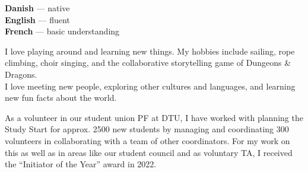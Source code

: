 \documentclass[9pt]{developercv} %
\begin{document}
\begin{minipage}[t]{0.3\textwidth}
	\vspace{-\baselineskip} %

	
	\textbf{Danish} --- native\\
	\textbf{English} --- fluent\\
	\textbf{French} --- basic understanding\\
\end{minipage}
\hfill
\begin{minipage}[t]{0.3\textwidth}
	\vspace{-\baselineskip} %
	

	I love playing around and learning new things. My hobbies include sailing, rope climbing, choir singing, and the collaborative storytelling game of Dungeons \& Dragons.\\

	I love meeting new people, exploring other cultures and languages, and learning new fun facts about the world. 
\end{minipage}
\hfill
\begin{minipage}[t]{0.3\textwidth}
	\vspace{-\baselineskip} %
	
	
	As a volunteer in our student union PF at DTU, I have worked with planning the Study Start for approx. 2500 new students by managing and coordinating 300 volunteers in collaborating with a team of other coordinators. For my work on this as well as in areas like our student council and as voluntary TA, I received the ``Initiator of the Year'' award in 2022. 
\end{minipage}

\end{document}
